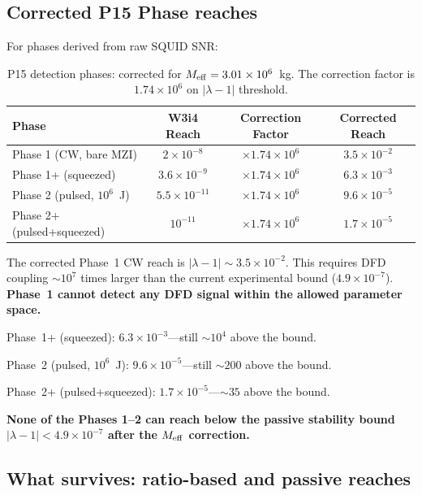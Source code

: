 \documentclass[11pt]{article}
\newcommand{\ee}[1]{\times 10^{#1}}
\newcommand{\lam}{\lambda}
\begin{document}
\subsection{Corrected P15 Phase reaches}

For phases derived from raw SQUID SNR:

\begin{table}[H]
\centering
\caption{P15 detection phases: corrected for $M_{\rm eff} = 3.01\ee{6}$~kg.
The correction factor is $1.74\ee{6}$ on $|\lam-1|$ threshold.}
\label{tab:P15-corrected}
\begin{tabular}{lccc}
\toprule
\textbf{Phase} & \textbf{W3i4 Reach} & \textbf{Correction Factor}
  & \textbf{Corrected Reach} \\
\midrule
Phase 1 (CW, bare MZI) & $2\ee{-8}$ & $\times 1.74\ee{6}$ & $3.5\ee{-2}$ \\
Phase 1+ (squeezed) & $3.6\ee{-9}$ & $\times 1.74\ee{6}$ & $6.3\ee{-3}$ \\
Phase 2 (pulsed, $10^6$~J) & $5.5\ee{-11}$ & $\times 1.74\ee{6}$ & $9.6\ee{-5}$ \\
Phase 2+ (pulsed+squeezed) & $10^{-11}$ & $\times 1.74\ee{6}$ & $1.7\ee{-5}$ \\
\bottomrule
\end{tabular}
\end{table}

\begin{tcolorbox}[colback=red!5!white, colframe=red!60!black,
  title=\textbf{CRITICAL: Phases 1--2 Are Not Viable After $M_{\rm eff}$ Correction}]
The corrected Phase~1 CW reach is $|\lam-1| \sim 3.5\ee{-2}$. This
requires DFD coupling $\sim 10^7$ times larger than the current
experimental bound ($4.9\ee{-7}$). \textbf{Phase~1 cannot detect
any DFD signal within the allowed parameter space.}

Phase~1+ (squeezed): $6.3\ee{-3}$---still $\sim 10^4$ above the bound.

Phase~2 (pulsed, $10^6$~J): $9.6\ee{-5}$---still $\sim 200$ above the bound.

Phase~2+ (pulsed+squeezed): $1.7\ee{-5}$---$\sim 35$ above the bound.

\textbf{None of the Phases 1--2 can reach below the passive stability bound
$|\lam-1| < 4.9\ee{-7}$ after the $M_{\rm eff}$ correction.}
\end{tcolorbox}

\subsection{What survives: ratio-based and passive reaches}
\end{document}
